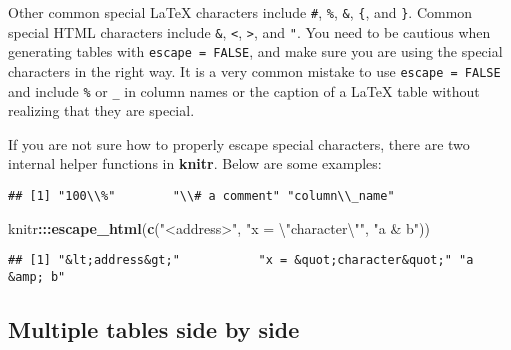 \documentclass[
  11pt,
]{krantz}
\newenvironment{Shaded}{\begin{snugshade}}{\end{snugshade}}
\newcommand{\CharTok}[1]{\textcolor[rgb]{0.5,0.5,0.5}{#1}}
\newcommand{\KeywordTok}[1]{\textcolor[rgb]{0.27,0.27,0.27}{\textbf{#1}}}
\newcommand{\NormalTok}[1]{#1}
\newcommand{\OperatorTok}[1]{\textcolor[rgb]{0.43,0.43,0.43}{\textbf{#1}}}
\newcommand{\StringTok}[1]{\textcolor[rgb]{0.5,0.5,0.5}{#1}}
\begin{document}
Other common special LaTeX characters include \texttt{\#}, \texttt{\%}, \texttt{\&}, \texttt{\{}, and \texttt{\}}. Common special HTML characters include \texttt{\&}, \texttt{\textless{}}, \texttt{\textgreater{}}, and \texttt{"}. You need to be cautious when generating tables with \texttt{escape\ =\ FALSE}, and make sure you are using the special characters in the right way. It is a very common mistake to use \texttt{escape\ =\ FALSE} and include \texttt{\%} or \texttt{\_} in column names or the caption of a LaTeX table without realizing that they are special.

If you are not sure how to properly escape special characters, there are two internal helper functions in \textbf{knitr}. Below are some examples:

\begin{Shaded}
\end{Shaded}

\begin{verbatim}
## [1] "100\\%"        "\\# a comment" "column\\_name"
\end{verbatim}

\begin{Shaded}
\begin{Highlighting}[]
\NormalTok{knitr}\OperatorTok{:::}\KeywordTok{escape_html}\NormalTok{(}\KeywordTok{c}\NormalTok{(}\StringTok{"<address>"}\NormalTok{, }\StringTok{"x = }\CharTok{\textbackslash{}"}\StringTok{character}\CharTok{\textbackslash{}"}\StringTok{"}\NormalTok{, }\StringTok{"a & b"}\NormalTok{))}
\end{Highlighting}
\end{Shaded}

\begin{verbatim}
## [1] "&lt;address&gt;"           "x = &quot;character&quot;" "a &amp; b"
\end{verbatim}

\hypertarget{multiple-tables-side-by-side}{%
\subsection{Multiple tables side by side}\label{multiple-tables-side-by-side}}
\end{document}
